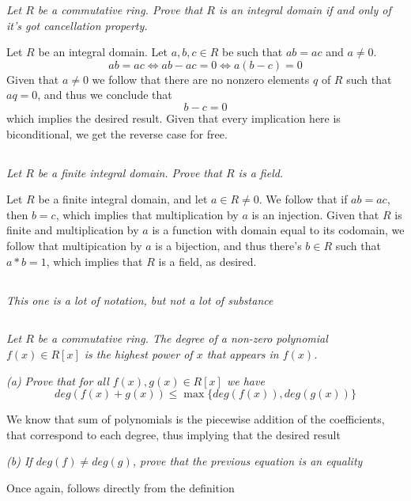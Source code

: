 \documentclass[11pt,oneside,titlepage]{book}
\DeclareMathOperator \lra {\Leftrightarrow}
\newcommand{\set}[1]{\{ #1 \}}
\begin{document}
\textit{Let $R$ be a commutative ring. Prove that $R$ is an integral
  domain if and only of it's got cancellation property.}

Let $R$ be an integral domain.  Let $a, b, c \in R$ be such that $ab =
ac$ and $a \neq 0$.
$$ab = ac \lra ab - ac = 0 \lra a(b - c) = 0$$
Given that $a \neq 0$ we follow that there are no nonzero elements $q$
of $R$ such that $aq = 0$, and thus we conclude that
$$b - c = 0$$
which implies the desired result. Given that every implication here is
biconditional, we get the reverse case for free.

\subsection{}

\textit{Let $R$ be a finite integral domain. Prove that $R$ is a
  field.}

Let $R$ be a finite integral domain, and let $a \in R \neq 0$. We
follow that if $ab = ac$, then $b = c$, which implies that
multiplication by $a$ is an injection. Given that $R$ is finite and
multiplication by $a$ is a function with domain equal to its codomain,
we follow that multipication by $a$ is a bijection, and thus there's
$b \in R$ such that $a * b = 1$, which implies that $R$ is a field, as
desired.

\subsection{}

\textit{This one is a lot of notation, but not a lot of substance}

\subsection{}

\textit{Let $R$ be a commutative ring. The degree of a non-zero
polynomial $f(x) \in R[x]$ is the highest power of $x$ that appears in
$f(x)$.}

\textit{(a) Prove that for all $f(x), g(x) \in R[x]$ we have
  $$deg(f(x) + g(x)) \leq \max \set{deg(f(x)), deg(g(x))}$$
}

We know that sum of polynomials is the piecewise addition of the
coefficients, that correspond to each degree, thus implying that
the desired result

\textit{(b) If $deg(f) \neq deg(g)$, prove that the previous equation
  is an equality}

Once again, follows directly from the definition
\end{document}
